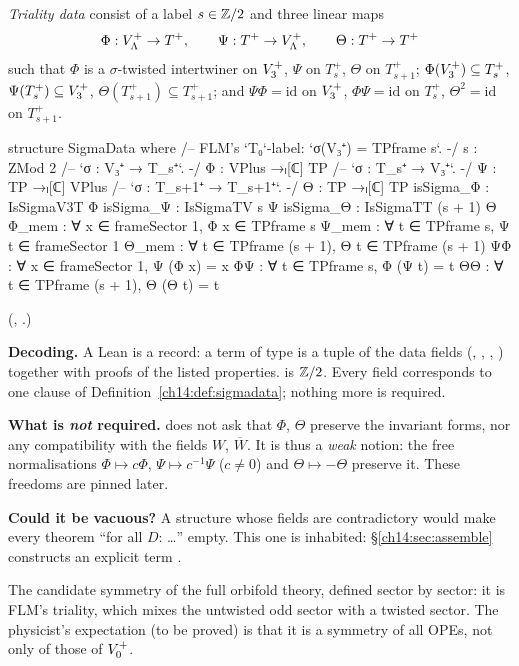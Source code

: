 \begin{definition}\label{ch14:def:sigmadata}
\emph{Triality data} consist of a label $s\in{\mathbb{Z}}/2$ and three linear maps
\begin{equation*}
  \Phi:V_{\Lambda}^+\to T^+,\qquad \Psi:T^+\to V_{\Lambda}^+,\qquad \Theta:T^+\to T^+
\end{equation*}
such that $\Phi$ is a $\sigma$-twisted intertwiner on $V_3^{+}$, $\Psi$ on $T_s^+$, $\Theta$ on
$T_{s+1}^+$; $\Phi(V_3^{+})\subseteq T_s^+$, $\Psi(T_s^+)\subseteq V_3^{+}$,
$\Theta(T_{s+1}^+)\subseteq T_{s+1}^+$; and $\Psi\Phi=\mathrm{id}$ on $V_3^{+}$, $\Phi\Psi=\mathrm{id}$
on $T_s^+$, $\Theta^2=\mathrm{id}$ on $T_{s+1}^+$.
\end{definition}
\begin{leancode}
structure SigmaData where
  /-- FLM's `T₀`-label: `σ(V₃⁺) = TPframe s`. -/
  s : ZMod 2
  /-- `σ : V₃⁺ → T_s⁺`. -/
  Φ : VPlus →ₗ[ℂ] TP
  /-- `σ : T_s⁺ → V₃⁺`. -/
  Ψ : TP →ₗ[ℂ] VPlus
  /-- `σ : T_{s+1}⁺ → T_{s+1}⁺`. -/
  Θ : TP →ₗ[ℂ] TP
  isSigma_Φ : IsSigmaV3T Φ
  isSigma_Ψ : IsSigmaTV s Ψ
  isSigma_Θ : IsSigmaTT (s + 1) Θ
  Φ_mem : ∀ x ∈ frameSector 1, Φ x ∈ TPframe s
  Ψ_mem : ∀ t ∈ TPframe s, Ψ t ∈ frameSector 1
  Θ_mem : ∀ t ∈ TPframe (s + 1), Θ t ∈ TPframe (s + 1)
  ΨΦ : ∀ x ∈ frameSector 1, Ψ (Φ x) = x
  ΦΨ : ∀ t ∈ TPframe s, Φ (Ψ t) = t
  ΘΘ : ∀ t ∈ TPframe (s + 1), Θ (Θ t) = t
\end{leancode}
(, .)

\begin{dictionary}
\textbf{Decoding.}  A Lean  is a record: a term of type  is a tuple
of the data fields (, , , ) together with proofs of the listed
properties.   is ${\mathbb{Z}}/2$.  Every field corresponds to one clause of
Definition~\ref{ch14:def:sigmadata}; nothing more is required.

\textbf{What is \emph{not} required.}   does not ask that $\Phi$, $\Theta$ preserve
the invariant forms, nor any compatibility with the fields $W$, $\overline W$.  It is thus a
\emph{weak} notion: the free normalisations $\Phi\mapsto c\Phi$, $\Psi\mapsto c^{-1}\Psi$ ($c\ne0$) and
$\Theta\mapsto-\Theta$ preserve it.  These freedoms are pinned later.

\textbf{Could it be vacuous?}  A structure whose fields are contradictory would make every theorem
``for all $D$: \ldots'' empty.  This one is inhabited: \S\ref{ch14:sec:assemble} constructs an
explicit term .
\end{dictionary}
\begin{physics}
The candidate symmetry of the full orbifold theory, defined sector by sector: it is FLM's triality, which mixes the untwisted odd sector with a twisted sector. The physicist's expectation (to be proved) is that it is a symmetry of all OPEs, not only of those of $V_0^{+}$.
\end{physics}


